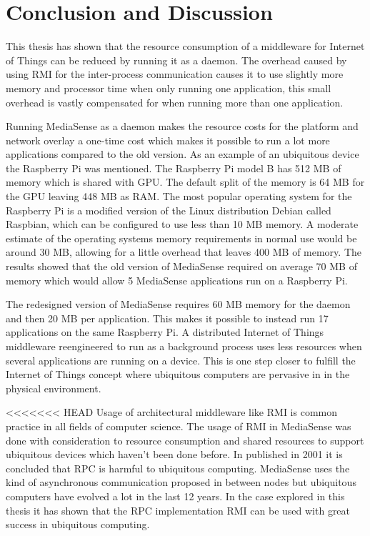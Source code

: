 \chapter{Conclusion and Discussion}

This thesis has shown that the resource consumption of a middleware for Internet of Things can be reduced by running it as a daemon. The overhead caused by using RMI for the inter-process communication causes it to use slightly more memory and processor time when only running one application, this small overhead is vastly compensated for when running more than one application. 

Running MediaSense as a daemon makes the resource costs for the platform and network overlay a one-time cost which makes it possible to run a lot more applications compared to the old version. As an example of an ubiquitous device the Raspberry Pi \cite{rpiweb} was mentioned. The Raspberry Pi model B has 512 MB of memory which is shared with GPU. The default split of the memory is 64 MB for the GPU leaving 448 MB as RAM. The most popular operating system for the Raspberry Pi is a modified version of the Linux distribution Debian called Raspbian, which can be configured to use less than 10 MB memory. A moderate estimate of the operating systems memory requirements in normal use would be around 30 MB, allowing for a little overhead that leaves 400 MB of memory. The results showed that the old version of MediaSense required on average 70 MB of memory which would allow 5 MediaSense applications run on a Raspberry Pi.

The redesigned version of MediaSense requires 60 MB memory for the daemon and then 20 MB per application. This makes it possible to instead run 17 applications on the same Raspberry Pi.
A distributed Internet of Things middleware reengineered to run as a background process uses less resources when several applications are running on a device. This is one step closer to fulfill the Internet of Things concept where ubiquitous computers are pervasive in in the physical environment.

<<<<<<< HEAD
Usage of architectural middleware like RMI is common practice in all fields of computer science. The usage of RMI in MediaSense was done with consideration to resource consumption and shared resources to support ubiquitous devices which haven't been done before. In \cite{ubiqrpc} published in 2001 it is concluded that RPC is harmful to ubiquitous computing. MediaSense uses the kind of asynchronous communication proposed in \cite{ubiqrpc} between nodes but ubiquitous computers have evolved a lot in the last 12 years. In the case explored in this thesis it has shown that the RPC implementation RMI can be used with great success in ubiquitous computing.

